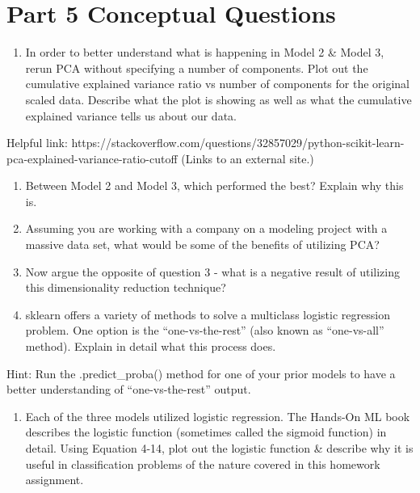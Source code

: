 \documentclass[11pt]{article}
\providecommand{\tightlist}{%
      \setlength{\itemsep}{0pt}\setlength{\parskip}{0pt}}
\begin{document}
    \hypertarget{part-5-conceptual-questions}{%
\section{Part 5 Conceptual
Questions}\label{part-5-conceptual-questions}}

    \begin{enumerate}
\def\labelenumi{\alph{enumi})}
\tightlist
\item
  In order to better understand what is happening in Model 2 \& Model 3,
  rerun PCA without specifying a number of components. Plot out the
  cumulative explained variance ratio vs number of components for the
  original scaled data. Describe what the plot is showing as well as
  what the cumulative explained variance tells us about our data.
\end{enumerate}

Helpful link:
https://stackoverflow.com/questions/32857029/python-scikit-learn-pca-explained-variance-ratio-cutoff
(Links to an external site.)

\begin{enumerate}
\def\labelenumi{\alph{enumi})}
\setcounter{enumi}{1}
\item
  Between Model 2 and Model 3, which performed the best? Explain why
  this is.
\item
  Assuming you are working with a company on a modeling project with a
  massive data set, what would be some of the benefits of utilizing PCA?
\item
  Now argue the opposite of question 3 - what is a negative result of
  utilizing this dimensionality reduction technique?
\item
  sklearn offers a variety of methods to solve a multiclass logistic
  regression problem. One option is the ``one-vs-the-rest'' (also known
  as ``one-vs-all'' method). Explain in detail what this process does.
\end{enumerate}

Hint: Run the .predict\_proba() method for one of your prior models to
have a better understanding of ``one-vs-the-rest'' output.

\begin{enumerate}
\def\labelenumi{\alph{enumi})}
\setcounter{enumi}{5}
\tightlist
\item
  Each of the three models utilized logistic regression. The Hands-On ML
  book describes the logistic function (sometimes called the sigmoid
  function) in detail. Using Equation 4-14, plot out the logistic
  function \& describe why it is useful in classification problems of
  the nature covered in this homework assignment.
\end{enumerate}
\end{document}
